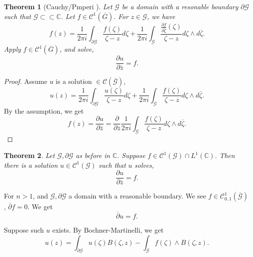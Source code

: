 \documentclass{article}
\newtheorem{theorem}{Theorem} [section]
\newcommand{\C}[0]{\mathbb{C}}
\newcommand{\G}[0]{\mathcal{G}}
\newcommand{\pd}[2]{{\frac {\partial#1} {\partial#2}}}
\newcommand{\bd}[0]{\partial}
\newcommand{\cz}[0]{\overline{z}}
\begin{document}
\begin{theorem}[Cauchy/Pmperi ]
  Let $\G$ be a domain with a resonable boundary $\bd\G$ such that $\G\subset\subset \C$. Let $f\in\mathcal{C}^1(\overline{G})$. For $z\in\G$, we have 
  \begin{equation*}
    f(z) = {\frac 1 {2\pi i}}\int_{\bd\G}{\frac {f(\zeta)} {\zeta-z}}d\zeta + {\frac 1 {2\pi i}}\int_\G{\frac{\pd{f}{\overline{\zeta}}(\zeta)} {\zeta-z}}d\zeta\wedge d\overline{\zeta}.
  \end{equation*}
  Apply $f\in \mathcal{C}^1(\overline{G})$, and solve,
  \begin{equation*}
    \pd{u}{\overline{z}} = f.
  \end{equation*}
\end{theorem}

\begin{proof}
  Assume $u$ is a solution $\in\mathcal{C}(\overline{\G})$, 
  \begin{equation*}
    u(z) = {\frac 1 {2\pi i}}\int_{\bd\G}{\frac {u(\zeta)}{\zeta-z}}d\zeta + {\frac 1 {2\pi i}}\int_\G{\frac {f(\zeta)} {\zeta-z}}d\zeta\wedge d\overline{\zeta}.
  \end{equation*}
  By the assumption, we get 
  \begin{equation*}
    f(z)  = \pd{u}{\overline{z}}=\pd{}{\cz}{\frac 1 {2\pi i}}\int_\G {\frac {f(\zeta)} {\zeta -z }}d\zeta\wedge d\overline{\zeta}.
  \end{equation*}
\end{proof}
\begin{theorem}
  Let $\G,\bd\G$ as before in $\C$. Suppose $f\in\mathcal{C}^1(\G)\cap L^1(\C)$. Then there is a solution $u\in\mathcal{C}^1(\G)$ such that $u$ solves,
  \begin{equation*}
    \pd{u}{\overline{z}} = f.
  \end{equation*}
\end{theorem}

For $n>1$, and $\G,\bd\G$ a domain with a reasonable boundary. We see $f\in\mathcal{C}^1_{0,1}(\overline{\G})$, $\overline{\partial}f = 0$. We get 
\begin{equation*}
  \overline{\partial}u = f.
\end{equation*}

Suppose such $u$ exists. By Bochner-Martinelli, we get 
\begin{equation*}
  u(z) = \int_{\bd\G}u(\zeta)B(\zeta,z) - \int_\G f(\zeta)\wedge B(\zeta,z).
\end{equation*}
\end{document}
